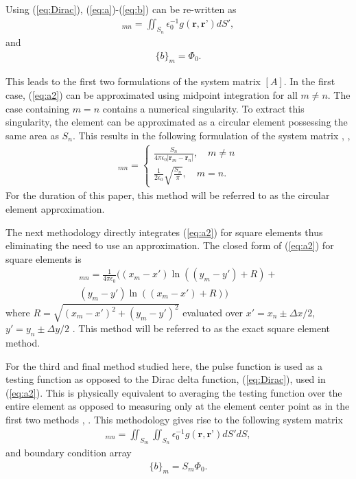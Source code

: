 Using (\ref{eq:Dirac}), (\ref{eq:a})-(\ref{eq:b}) can be re-written as
\begin{align}
    [A]_{mn}=\iint_{S_{n}} \epsilon_0^{-1}g(\textbf{r},\textbf{r'})dS',
    \label{eq:a2}
\end{align}
and 
\begin{align}
    \{b\}_m=\Phi_0.
    \label{eq:b2}
\end{align}

This leads to the first two formulations of the system matrix $[A]$. In the first case, (\ref{eq:a2}) can be approximated using midpoint integration for all $m \neq n$. The case containing $m=n$ contains a numerical singularity. To extract this singularity, the element can be approximated as a circular element possessing the same area as $S_n$. This results in the following formulation of the system matrix \cite{rothlecnotes}, \cite{jin2011theory},
\begin{align}
    [A]_{mn}=\begin{cases}
        \frac{S_n}{4\pi\epsilon_0|\textbf{r}_m-\textbf{r}_n|}, \quad m\neq n \\
        \frac{1}{2\epsilon_0}\sqrt{\frac{S_n}{\pi}}, \quad m=n.
    \end{cases}
    \label{eq:aaprox}
\end{align}
For the duration of this paper, this method will be referred to as the circular element approximation.

The next methodology directly integrates (\ref{eq:a2}) for square elements thus eliminating the need to use an approximation. The closed form of (\ref{eq:a2}) for square elements is
\begin{multline}
    [A]_{mn}=\frac{1}{4\pi\epsilon_0}\big((x_m-x')\ln((y_m-y')+R)+\\
    (y_m-y')\ln((x_m-x')+R)\big)
    \label{eq:aexact}
\end{multline}
where $R=\sqrt{(x_m-x')^2+(y_m-y')^2}$ evaluated over $x'=x_n\pm\Delta x / 2$, $y'=y_n\pm\Delta y / 2$ \cite{jin2011theory}. This method will be referred to as the exact square element method.

For the third and final method studied here, the pulse function is used as a testing function as opposed to the Dirac delta function, (\ref{eq:Dirac}), used in (\ref{eq:a2}). This is physically equivalent to averaging the testing function over the entire element as opposed to measuring only at the element center point as in the first two methods \cite{rothlecnotes}, \cite{jin2011theory}. This methodology gives rise to the following system matrix
\begin{align}
    [A]_{mn}=\iint_{S_m}\iint_{S_n} \epsilon_0^{-1}g(\textbf{r},\textbf{r'})dS'dS,
    \label{eq:a3}
\end{align}
and boundary condition array
\begin{align}
    \{b\}_m=S_m\Phi_0.
    \label{eq:b3}
\end{align}

